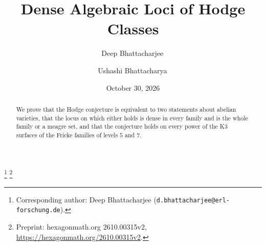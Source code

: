 \documentclass[11pt,reqno]{amsart}
\numberwithin{equation}{section}
\theoremstyle{plain}
\theoremstyle{definition}
\begin{document}
\title[Dense Algebraic Loci of Hodge Classes]{Dense Algebraic Loci of Hodge Classes}

\author{Deep Bhattacharjee\,}
\address{Formerly, Electro-Gravitational Space Propulsion Laboratory (EGSPL), Bhubaneswar, Odisha 751030, India; Formerly, University of Calcutta (Heramba Chandra College), 23/49 Gariahat Road, Golpark, Kolkata 700029, West Bengal, India}
\thanks{Corresponding author: Deep Bhattacharjee (\nolinkurl{d.bhattacharjee@erl-forschung.de}).}
\thanks{Preprint: hexagonmath.org 2610.00315v2, \url{https://hexagonmath.org/2610.00315v2}.}

\author{Ushashi Bhattacharya\,}
\address{Formerly, National Taiwan University, Taipei 106319, Taiwan}

\date{October 30, 2026}


\begin{abstract}
We prove that the Hodge conjecture is equivalent to two statements about abelian varieties, that the locus on which either holds is dense in every family and is the whole family or a meagre set, and that the conjecture holds on every power of the K3 surfaces of the Fricke families of levels $5$ and $7$.
\end{abstract}

\maketitle
\setcounter{tocdepth}{1}
\tableofcontents










\appendix






\end{document}
